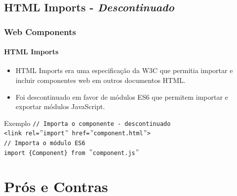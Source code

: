\documentclass[
	9pt, %
	t, %
]{beamer}
\begin{document}
\subsection{HTML Imports - \textit{Descontinuado}}

\begin{frame}
	\frametitle{Web Components}
	\framesubtitle{HTML Imports}
	\begin{itemize}
		\item HTML Imports era uma especificação da W3C que permitia importar e incluir
		      componentes web em outros documentos HTML.
		\item Foi descontinuado em favor de módulos ES6 que permitem importar e exportar
		      módulos JavaScript.
	\end{itemize}

	\begin{block}{Exemplo}
		\texttt{// Importa o componente - \alert{descontinuado}}\\
		\texttt{<link rel=$"$import$"$ href=$"$component.html$"$>}\\

		\bigskip
		\texttt{// Importa o módulo ES6}\\
		\texttt{import \{Component\} from $"$component.js$"$}
	\end{block}

\end{frame}

\section{Prós e Contras}
\end{document}

